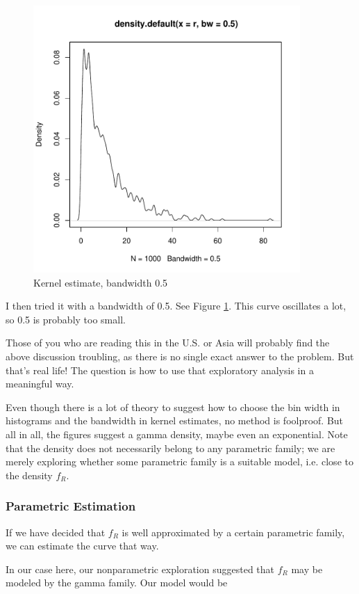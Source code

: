 \begin{figure}[tb] 
\centerline{
\includegraphics[width=4.0in]{Hist4.pdf}
}
\caption{Kernel estimate, bandwidth 0.5}
\label{h4}   
\end{figure}

I then tried it with a bandwidth of 0.5.  See Figure \ref{h4}.  This
curve oscillates a lot, so 0.5 is probably too small.

Those of you who are reading this in the U.S. or Asia will probably find
the above discussion troubling, as there is no single exact answer to
the problem.  But that's real life!  The question is how to use that
exploratory analysis in a meaningful way.

Even though there is a lot of theory to suggest how to choose the bin
width in histograms and the bandwidth in kernel estimates, no method is
foolproof.  But all in all, the figures suggest a gamma density, maybe
even an exponential.  Note that the density does not necessarily belong
to any parametric family; we are merely exploring whether some
parametric family is a suitable model, i.e. close to the density $f_R$.

\subsubsection{Parametric Estimation}

If we have decided that $f_R$ is well approximated by a certain
parametric family, we can estimate the curve that way.

In our case here, our nonparametric exploration suggested that $f_R$ may
be modeled by the gamma family.  Our model would be


